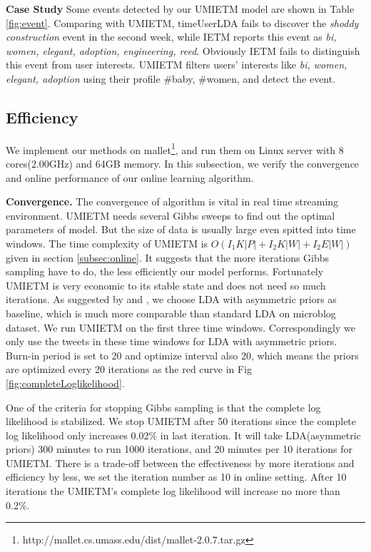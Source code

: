 \documentclass[conference,compsoc]{IEEEtran}
\begin{document}
\textbf{Case Study} 
Some events detected by our UMIETM model are shown in Table \ref{fig:event}.
Comparing with UMIETM, timeUserLDA fails to discover the \textit{shoddy construction} event in the second week, while IETM reports this event as \textit{bi, women, elegant, adoption, engineering, reed}. Obviously IETM fails to distinguish this event from user interests.
UMIETM filters users' interests like \textit{bi, women, elegant, adoption} using their profile {\#baby, \#women}, and detect the event.
\subsection{Efficiency}
We implement our methods on mallet\footnote{http://mallet.cs.umass.edu/dist/mallet-2.0.7.tar.gz}, and run them on Linux server with 8 cores(2.00GHz) and 64GB memory.
In this subsection, we verify the convergence and online performance of our online learning algorithm. 

\textbf{Convergence.}
The convergence of algorithm is vital in real time streaming environment. 
UMIETM needs several Gibbs sweeps to find out the optimal parameters of model.
But the size of data is usually large even spitted into time windows.
The time complexity of UMIETM is \(O(I_1K|P|+I_2K|W|+I_2E|W|)\) given in section \ref{subsec:online}.
It suggests that the more iterations Gibbs sampling have to do, the less efficiently our model performs. 
Fortunately UMIETM is very economic to its stable state and does not need so much iterations.
As suggested by \cite{wallach2009rethinking} and \cite{jian2014factorOfTopicModel}, we choose LDA with asymmetric priors as baseline, which is much more comparable than standard LDA on microblog dataset.
We run UMIETM on the first three time windows. 
Correspondingly we only use the tweets in these time windows for LDA with asymmetric priors.
Burn-in period is set to 20 and optimize interval also 20, which means the priors are optimized every 20 iterations as the red curve in Fig \ref{fig:completeLoglikelihood}.

One of the criteria for stopping Gibbs sampling is that the complete log likelihood is stabilized.
We stop UMIETM after 50 iterations since the complete log likelihood only increases 0.02\% in last iteration.
It will take LDA(asymmetric priors) 300 minutes to run 1000 iterations, and 20 minutes per 10 iterations for UMIETM.
There is a trade-off between the effectiveness by more iterations and efficiency by less,  we set the iteration number as 10 in online setting.
After 10 iterations the UMIETM's complete log likelihood will increase no more than 0.2\%.
\end{document}
